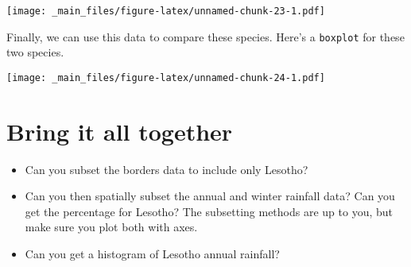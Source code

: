 \documentclass[
]{book}
\newenvironment{Shaded}{\begin{snugshade}}{\end{snugshade}}
\newcommand{\AttributeTok}[1]{\textcolor[rgb]{0.77,0.63,0.00}{#1}}
\newcommand{\DecValTok}[1]{\textcolor[rgb]{0.00,0.00,0.81}{#1}}
\newcommand{\FunctionTok}[1]{\textcolor[rgb]{0.00,0.00,0.00}{#1}}
\newcommand{\NormalTok}[1]{#1}
\newcommand{\SpecialCharTok}[1]{\textcolor[rgb]{0.00,0.00,0.00}{#1}}
\newcommand{\StringTok}[1]{\textcolor[rgb]{0.31,0.60,0.02}{#1}}
\providecommand{\tightlist}{%
  \setlength{\itemsep}{0pt}\setlength{\parskip}{0pt}}
\begin{document}
\texttt{[image: \_main\_files/figure-latex/unnamed-chunk-23-1.pdf]}

Finally, we can use this data to compare these species. Here's a \texttt{boxplot} for these two species.

\begin{Shaded}
\end{Shaded}

\texttt{[image: \_main\_files/figure-latex/unnamed-chunk-24-1.pdf]}

\hypertarget{bring-it-all-together}{%
\chapter{Bring it all together}\label{bring-it-all-together}}

\begin{itemize}
\tightlist
\item
  Can you subset the borders data to include only Lesotho?
\item
  Can you then spatially subset the annual and winter rainfall data? Can you get the percentage for Lesotho? The subsetting methods are up to you, but make sure you plot both with axes.
\item
  Can you get a histogram of Lesotho annual rainfall?
\end{itemize}

  
\end{document}
